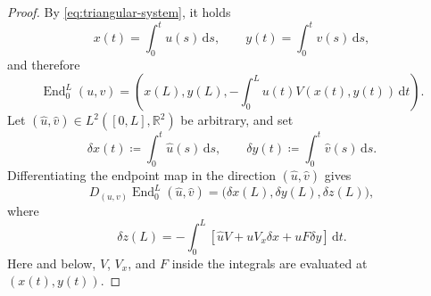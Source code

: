 \documentclass[10pt,a4paper]{amsart}
\newcommand{\End}{\operatorname{End}}
\newcommand{\R}{\mathbb R}
\newcommand{\dd}{\,\mathrm d}
\begin{document}
\begin{proof}
By \eqref{eq:triangular-system}, it holds
\begin{equation}
 x(t)=\int_0^t u(s)\dd s,
 \qquad
 y(t)=\int_0^t v(s)\dd s,
\end{equation}
and therefore
\begin{equation}
 \End_0^L(u,v)
 =
 \left(
 x(L),y(L),
 -\int_0^L u(t)V(x(t),y(t))\dd t
 \right).
\end{equation}
Let $(\widehat u,\widehat v)\in L^2([0,L],\R^2)$ be arbitrary, and set
\begin{equation}
 \delta x(t)\coloneq \int_0^t\widehat u(s)\dd s,
 \qquad
 \delta y(t)\coloneq \int_0^t\widehat v(s)\dd s.
\end{equation}
Differentiating the endpoint map in the direction
$(\widehat u,\widehat v)$ gives
\begin{equation}
 D_{(u,v)}\End_0^L(\widehat u,\widehat v)
 =
 \bigl(\delta x(L),\delta y(L),\delta z(L)\bigr),
\end{equation}
where
\begin{equation}
 \delta z(L)
 =
 -\int_0^L
 \left[
 \widehat u V
 +uV_x \delta x
 +uF \delta y
 \right]\dd t.
\end{equation}
Here and below, $V$, $V_x$, and $F$ inside the integrals are evaluated at
$(x(t),y(t))$.


\end{proof}
\end{document}

